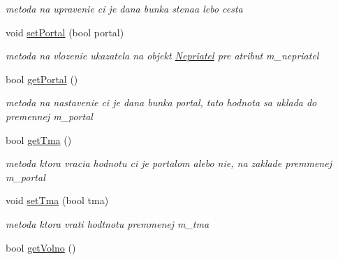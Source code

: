 \begin{DoxyCompactItemize}
\begin{DoxyCompactList}\small\item\em metoda na upravenie ci je dana bunka stenaa lebo cesta \end{DoxyCompactList}\item 
\hypertarget{class_bunka_a814b7c399a0a58c46e0a9bfd5a050e30}{void \hyperlink{class_bunka_a814b7c399a0a58c46e0a9bfd5a050e30}{set\-Portal} (bool portal)}\label{class_bunka_a814b7c399a0a58c46e0a9bfd5a050e30}

\begin{DoxyCompactList}\small\item\em metoda na vlozenie ukazatela na objekt \hyperlink{class_nepriatel}{Nepriatel} pre atribut m\-\_\-nepriatel \end{DoxyCompactList}\item 
\hypertarget{class_bunka_ad3d016c5017831e18d22e7266e2f01e9}{bool \hyperlink{class_bunka_ad3d016c5017831e18d22e7266e2f01e9}{get\-Portal} ()}\label{class_bunka_ad3d016c5017831e18d22e7266e2f01e9}

\begin{DoxyCompactList}\small\item\em metoda na nastavenie ci je dana bunka portal, tato hodnota sa uklada do premennej m\-\_\-portal \end{DoxyCompactList}\item 
\hypertarget{class_bunka_a3a206499f4794ae44245b0a13a10694c}{bool \hyperlink{class_bunka_a3a206499f4794ae44245b0a13a10694c}{get\-Tma} ()}\label{class_bunka_a3a206499f4794ae44245b0a13a10694c}

\begin{DoxyCompactList}\small\item\em metoda ktora vracia hodnotu ci je portalom alebo nie, na zaklade premmenej m\-\_\-portal \end{DoxyCompactList}\item 
\hypertarget{class_bunka_a963722f14fa3af3fd246def7092b468c}{void \hyperlink{class_bunka_a963722f14fa3af3fd246def7092b468c}{set\-Tma} (bool tma)}\label{class_bunka_a963722f14fa3af3fd246def7092b468c}

\begin{DoxyCompactList}\small\item\em metoda ktora vrati hodtnotu premmenej m\-\_\-tma \end{DoxyCompactList}\item 
\hypertarget{class_bunka_a741795ec3909545af530c88b3010c51c}{bool \hyperlink{class_bunka_a741795ec3909545af530c88b3010c51c}{get\-Volno} ()}\label{class_bunka_a741795ec3909545af530c88b3010c51c}


\end{DoxyCompactItemize}
